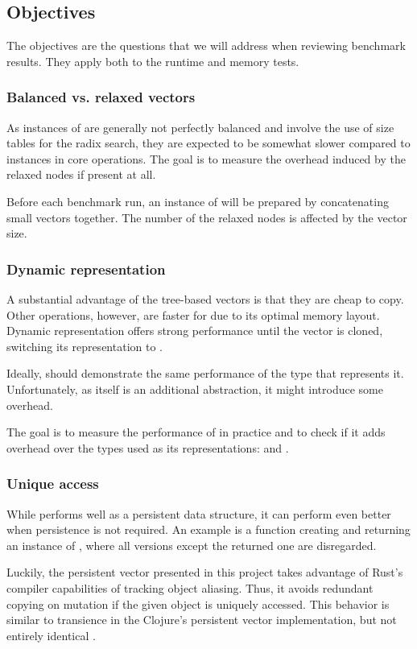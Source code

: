 \subsection{Objectives}
The objectives are the questions that we will address when reviewing benchmark results. They apply both to the runtime and memory tests.

\subsubsection*{Balanced vs. relaxed vectors}
As instances of \rrbtree{} are generally not perfectly balanced and involve the use of size tables for the radix search, they are expected to be somewhat slower compared to \rbtree{} instances in core operations. The goal is to measure the overhead induced by the relaxed nodes if present at all.

Before each benchmark run, an instance of \rrbvec{} will be prepared by concatenating small vectors together. The number of the relaxed nodes is affected by the vector size.

\subsubsection*{Dynamic representation}
A substantial advantage of the tree-based vectors is that they are cheap to copy. Other operations, however, are faster for \stdvec{} due to its optimal memory layout. Dynamic representation offers strong \stdvec{} performance until the vector is cloned, switching its representation to \rrbvec{}.

Ideally, \pvec{} should demonstrate the same performance of the type that represents it. Unfortunately, as \pvec{} itself is an additional abstraction, it might introduce some overhead.

The goal is to measure the performance of \pvec{} in practice and to check if it adds overhead over the types used as its representations: \stdvec{} and \rrbvec{}.

\subsubsection*{Unique access}
While \rrbvec{} performs well as a persistent data structure, it can perform even better when persistence is not required. An example is a function creating and returning an instance of \rrbvec{}, where all versions except the returned one are disregarded.

Luckily, the persistent vector presented in this project takes advantage of Rust's compiler capabilities of tracking object aliasing. Thus, it avoids redundant copying on mutation if the given object is uniquely accessed. This behavior is similar to transience in the Clojure's persistent vector implementation, but not entirely identical \cite{improving-performance-through-transience}.

